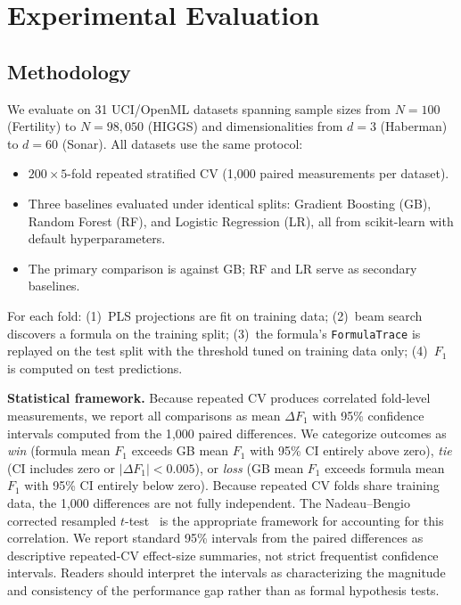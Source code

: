 \documentclass[journal]{IEEEtran}
\begin{document}
\section{Experimental Evaluation}
\label{sec:eval}

\subsection{Methodology}
\label{sec:methodology}

We evaluate on 31 UCI/OpenML datasets spanning sample sizes from
$N = 100$ (Fertility) to $N = 98{,}050$ (HIGGS) and
dimensionalities from $d = 3$ (Haberman) to $d = 60$ (Sonar).
All datasets use the same protocol:

\begin{itemize}
\item $200 \times 5$-fold repeated stratified CV (1{,}000 paired
measurements per dataset).
\item Three baselines evaluated under identical splits: Gradient
Boosting (GB), Random Forest (RF), and Logistic Regression (LR),
all from scikit-learn with default hyperparameters.
\item The primary comparison is against GB; RF and LR serve as
secondary baselines.
\end{itemize}

For each fold: (1)~PLS projections are fit on training data;
(2)~beam search discovers a formula on the training split;
(3)~the formula's \texttt{FormulaTrace} is replayed on the test
split with the threshold tuned on training data only;
(4)~$F_1$ is computed on test predictions.

\textbf{Statistical framework.}
Because repeated CV produces correlated fold-level measurements,
we report all comparisons as mean $\Delta F_1$ with 95\% confidence
intervals computed from the 1{,}000 paired differences.  We
categorize outcomes as \emph{win} (formula mean $F_1$ exceeds GB
mean $F_1$ with 95\% CI entirely above zero), \emph{tie} (CI
includes zero or $|\Delta F_1| < 0.005$), or \emph{loss}
(GB mean $F_1$ exceeds formula mean $F_1$ with 95\% CI entirely
below zero).  Because repeated CV folds share training data,
the 1{,}000 differences are not fully independent.  The
Nadeau--Bengio corrected resampled
$t$-test~\cite{nadeau2003inference} is the appropriate framework
for accounting for this correlation.  We report standard 95\%
intervals from the paired differences as descriptive
repeated-CV effect-size summaries, not strict frequentist
confidence intervals.  Readers should interpret the intervals
as characterizing the magnitude and consistency of the
performance gap rather than as formal hypothesis tests.
\end{document}
